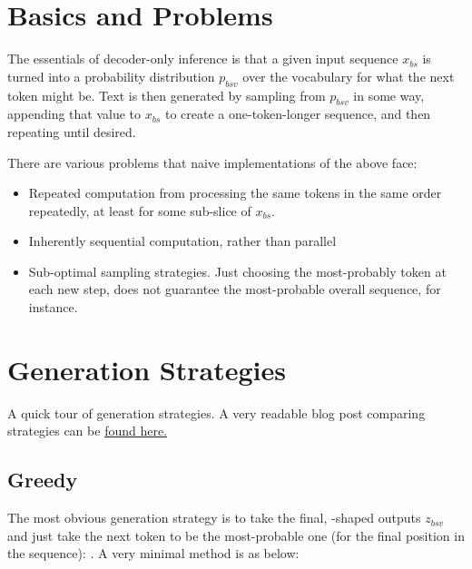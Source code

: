 \documentclass[11pt]{article}
\begin{document}
\section{Basics and Problems}


The essentials of decoder-only inference is that a given input sequence $ x _{ bs } $ is turned into
a probability distribution $ p _{ bsv } $ over the vocabulary for what the next token might be.  Text
is then generated by sampling from $ p _{ bsv } $ in some way, appending that value to $ x _{ bs } $
to create a one-token-longer sequence, and then repeating until desired.

There are various problems that naive implementations of the above face:
\begin{itemize}
	\item Repeated computation from processing the same tokens in the same order repeatedly, at least for
	      some sub-slice of $ x _{ bs } $.
	\item Inherently sequential computation, rather than parallel
	\item Sub-optimal sampling strategies. Just choosing the most-probably token at each new step, does
	      not guarantee the most-probable overall sequence, for instance.
\end{itemize}



\section{Generation Strategies \label{sec_generation_strats} }

A quick tour of generation strategies. A very readable blog post comparing strategies can be
\href{https://huggingface.co/blog/how-to-generate}{found here.}


\subsection{Greedy \label{subsec_greedy_gen}}

The most obvious generation strategy is to take the final, -shaped outputs $ z
		_{ bsv } $ and just take the next token to be the most-probable one (for the final position in the
sequence): . A very minimal  method
is as below:
\end{document}
